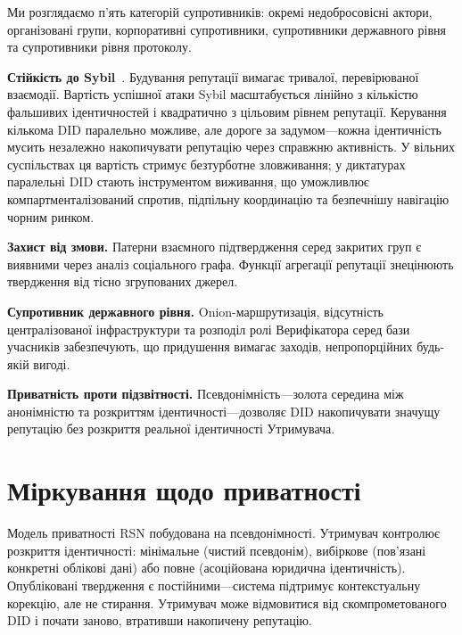 \documentclass[11pt,a4paper,twocolumn]{article}
\begin{document}
Ми розглядаємо п'ять категорій супротивників: окремі недобросовісні актори, організовані групи, корпоративні супротивники, супротивники державного рівня та супротивники рівня протоколу.

\textbf{Стійкість до Sybil}~\cite{douceur2002}. Будування репутації вимагає тривалої, перевірюваної взаємодії. Вартість успішної атаки Sybil масштабується лінійно з кількістю фальшивих ідентичностей і квадратично з цільовим рівнем репутації. Керування кількома DID паралельно можливе, але дороге за задумом---кожна ідентичність мусить незалежно накопичувати репутацію через справжню активність. У вільних суспільствах ця вартість стримує безтурботне зловживання; у диктатурах паралельні DID стають інструментом виживання, що уможливлює компартменталізований спротив, підпільну координацію та безпечнішу навігацію чорним ринком.

\textbf{Захист від змови.} Патерни взаємного підтвердження серед закритих груп є виявними через аналіз соціального графа. Функції агрегації репутації знецінюють твердження від тісно згрупованих джерел.

\textbf{Супротивник державного рівня.} Onion-маршрутизація, відсутність централізованої інфраструктури та розподіл ролі Верифікатора серед бази учасників забезпечують, що придушення вимагає заходів, непропорційних будь-якій вигоді.

\textbf{Приватність проти підзвітності.} Псевдонімність---золота середина між анонімністю та розкриттям ідентичності---дозволяє DID накопичувати значущу репутацію без розкриття реальної ідентичності Утримувача.

\section{Міркування щодо приватності}

Модель приватності RSN побудована на псевдонімності. Утримувач контролює розкриття ідентичності: мінімальне (чистий псевдонім), вибіркове (пов'язані конкретні облікові дані) або повне (асоційована юридична ідентичність). Опубліковані твердження є постійними---система підтримує контекстуальну корекцію, але не стирання. Утримувач може відмовитися від скомпрометованого DID і почати заново, втративши накопичену репутацію.

\end{document}
